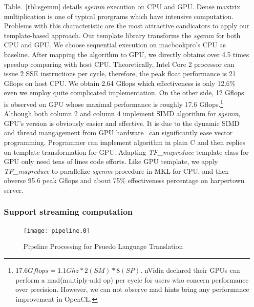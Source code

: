 \documentclass[10pt, conference, compsocconf]{IEEEtran}
\begin{document}
Table.~\ref{tbl:sgemm} details \textit{sgemm} execution on CPU and GPU. Dense maxtrix
multiplication is one of  typical prorgrams which have
intensive computation. Problems with this characteristic are the most
attractive candicators to apply our template-based approach.
Our template library transforms the \textit{sgemm} for both CPU and 
GPU. We choose sequential execution on macbookpro's CPU as
baseline. After mapping the algorithm to GPU, we directly obtains over
4.5 times speedup comparing with host CPU. Theoretically,  Intel Core
2 processor can issue 2 SSE instructions per cycle,  therefore, the
peak float performance is 21 Gflops on host CPU. We obtain 2.64 Gflops which
effectiveness is only 12.6\% even we employ quite complicated
implementation. On the other side, 12 Gflops is observed on GPU whose
maximal performance is roughly 17.6 Gflops.\footnote{$17.6Gflops = 1.1Ghz * 2(SM) *
  8(SP)$. nVidia declared their GPUs can perform a mad(multiply-add
  op) per cycle  for users who concern performance over precision. However, we can
  not observe mad hints bring any performance improvement in OpenCL. }
Although both column 2 and column 4 implement SIMD algorithm for
\textit{sgemm}, GPU's version is obviously easier and effective. It is
due to the dynamic SIMD and thread mangagement from GPU
hardware~\cite{Fatahalian08} can significantly ease vector programming. Programmer can
implement algorithm in plain C and then replies on template
transformation for GPU.  Adapting \emph{TF\_mapreduce} template class
for GPU only need tens of lines code efforts. Like GPU template, we apply
\emph{TF\_mapreduce} to parallelize \textit{sgemm} procedure in MKL for CPU, and then obverse 95.6 peak
Gflops and about 75\% effectiveness percentage on harpertown server.

\subsubsection{Support streaming computation}
\begin{figure}[htp]
\texttt{[image: pipeline.0]}
\caption{Pipeline Processing for Psuedo Language Translation}\label{fig:pipe}
\end{figure}
\end{document}
